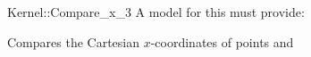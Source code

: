 \begin{ccRefFunctionObjectConcept}{Kernel::Compare_x_3}
A model for this must provide:


      {Compares the Cartesian $x$-coordinates of points  and
      }

\end{ccRefFunctionObjectConcept}
